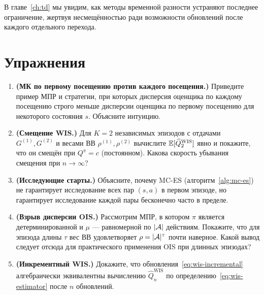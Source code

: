 В главе~\ref{ch:td} мы увидим, как методы временной разности устраняют последнее ограничение, жертвуя несмещённостью ради возможности обновлений после каждого отдельного перехода.

\section*{Упражнения}

\begin{enumerate}
  \item \textbf{(МК по первому посещению против каждого посещения.)}  Приведите пример МПР и стратегии, при которых дисперсия оценщика по каждому посещению строго меньше дисперсии оценщика по первому посещению для некоторого состояния $s$.  Объясните интуицию.

  \item \textbf{(Смещение WIS.)}  Для $K=2$ независимых эпизодов с отдачами $G^{(1)}, G^{(2)}$ и весами ВВ $\rho^{(1)}, \rho^{(2)}$ вычислите $\operatorname{\mathbb{E}}[\widehat{Q}_2^{\mathrm{WIS}}]$ явно и покажите, что он смещён при $Q^\pi = c$ (постоянном).  Какова скорость убывания смещения при $n \to \infty$?

  \item \textbf{(Исследующие старты.)}  Объясните, почему MC-ES (алгоритм~\ref{alg:mc-es}) не гарантирует исследование всех пар $(s,a)$ в первом эпизоде, но гарантирует исследование каждой пары бесконечно часто в пределе.

  \item \textbf{(Взрыв дисперсии OIS.)}  Рассмотрим МПР, в котором $\pi$ является детерминированной и $\mu$ --- равномерной по $|\mathcal{A}|$ действиям.  Покажите, что для эпизода длины $\tau$ вес ВВ удовлетворяет $\rho = |\mathcal{A}|^\tau$ почти наверное.  Какой вывод следует отсюда для практического применения OIS при длинных эпизодах?

  \item \textbf{(Инкрементный WIS.)}  Докажите, что обновления~\eqref{eq:wis-incremental} алгебраически эквивалентны вычислению $\widehat{Q}_n^{\mathrm{WIS}}$ по определению~\eqref{eq:wis-estimator} после $n$ обновлений.
\end{enumerate}
